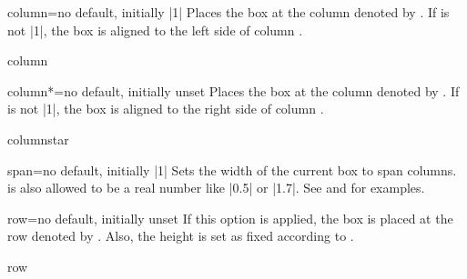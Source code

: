 \begin{posterlocTcbKey}[][doc new=2017-07-03]{column}{=}{no default, initially |1|}
  Places the box at the column denoted by . If 
  is not |1|, the box is aligned to the left side of column .
\begin{exdispExample}{column}
\begin{tcbposter}[
  poster = {showframe,height=2.5cm,spacing=2mm,rows=2},
  boxes  = {beamer,colframe=blue!50!black,colback=blue!50,colupper=yellow!50},
]
\end{tcbposter}
\end{exdispExample}
\end{posterlocTcbKey}

\enlargethispage*{1cm}
\begin{posterlocTcbKey}[][doc new=2017-07-03]{column*}{=}{no default, initially unset}
  Places the box at the column denoted by . If 
  is not |1|, the box is aligned to the right side of column .
\begin{exdispExample}{columnstar}
\begin{tcbposter}[
  poster = {showframe,height=2.5cm,spacing=2mm,rows=2},
  boxes  = {beamer,colframe=blue!50!black,colback=blue!50,colupper=yellow!50},
]
\end{tcbposter}
\end{exdispExample}
\end{posterlocTcbKey}


\clearpage
\begin{posterlocTcbKey}[][doc new=2017-07-03]{span}{=}{no default, initially |1|}
  Sets the width of the current box to span  columns.
   is also allowed to be a real number like |0.5| or |1.7|.
  See  and 
  for examples.
\end{posterlocTcbKey}

\begin{posterlocTcbKey}[][doc new=2017-07-03]{row}{=}{no default, initially unset}
  If this option is applied, the box is placed at the row denoted by .
  Also, the height is set as fixed according to .
\begin{exdispExample}{row}
\begin{tcbposter}[
  poster = {showframe,height=2.5cm,spacing=2mm,rows=2},
  boxes  = {beamer,colframe=blue!50!black,colback=blue!50,colupper=yellow!50},
]
\end{tcbposter}
\end{exdispExample}
\end{posterlocTcbKey}

